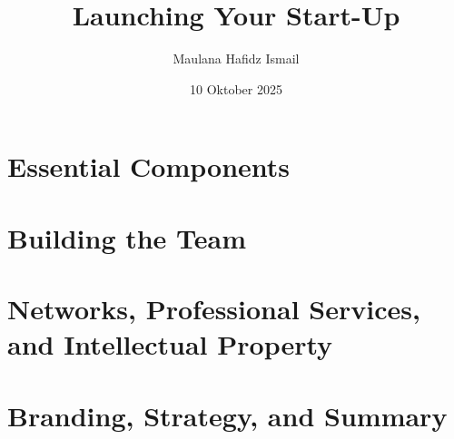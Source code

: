 \documentclass{article}
\title{Launching Your Start-Up}
\date{10 Oktober 2025}
\author{Maulana Hafidz Ismail}
\begin{document}
\maketitle
\newpage

\tableofcontents
\newpage
{}

\section{Essential Components}

\section{Building the Team}

\section{Networks, Professional Services, and Intellectual Property}

\section{Branding, Strategy, and Summary}
\end{document}
